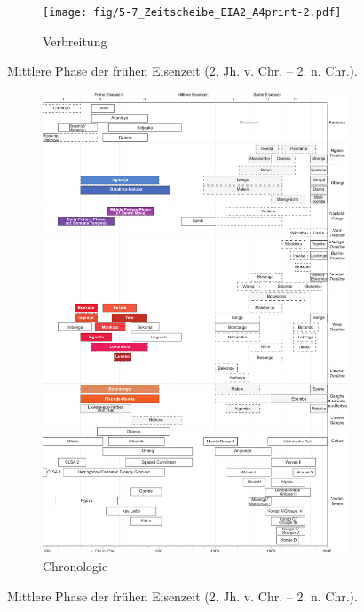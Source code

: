 \begin{figure}[p]
	\centering
	\begin{subfigure}[b]{\textwidth}
		\centering
		\texttt{[image: fig/5-7\_Zeitscheibe\_EIA2\_A4print-2.pdf]}
		\vspace{4cm}
		\caption{Verbreitung}
		\label{fig:EIA2_Karte}
	\end{subfigure}
	\caption{Mittlere Phase der frühen Eisenzeit (2. Jh. v. Chr. -- 2. n. Chr.).}
	\label{}
\end{figure}
\addtocounter{figure}{-1}
\begin{figure}[p]
	\begin{subfigure}[b]{\textwidth}
		\setcounter{subfigure}{1}
		\centering
		\includegraphics[height = .9\textheight]{fig/Chronologiesystem_v4_Zeitscheibe_EIA2.pdf}
		\caption{Chronologie}
		\label{fig:EIA2_Chronologie}
	\end{subfigure}
	\caption{Mittlere Phase der frühen Eisenzeit (2. Jh. v. Chr. -- 2. n. Chr.).}
	\label{fig:EIA2}
\end{figure}

